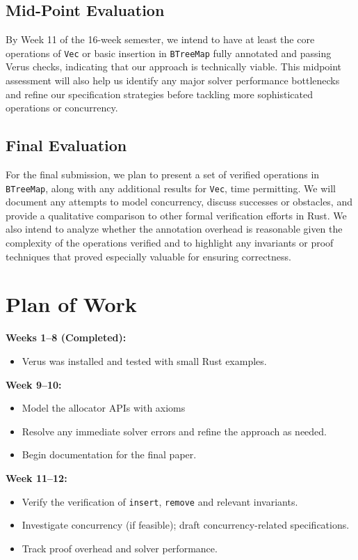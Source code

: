 \documentclass[conference]{IEEEtran}
\begin{document}
\subsection{Mid-Point Evaluation}
By Week 11 of the 16-week semester, we intend to have at least the core operations of \texttt{Vec} or basic insertion in \texttt{BTreeMap} fully annotated and passing Verus checks, indicating that our approach is technically viable. This midpoint assessment will also help us identify any major solver performance bottlenecks and refine our specification strategies before tackling more sophisticated operations or concurrency.

\subsection{Final Evaluation}
For the final submission, we plan to present a set of verified operations in \texttt{BTreeMap}, along with any additional results for \texttt{Vec}, time permitting. We will document any attempts to model concurrency, discuss successes or obstacles, and provide a qualitative comparison to other formal verification efforts in Rust. We also intend to analyze whether the annotation overhead is reasonable given the complexity of the operations verified and to highlight any invariants or proof techniques that proved especially valuable for ensuring correctness.


\section{Plan of Work}
\noindent\textbf{Weeks 1--8 (Completed):}
\begin{itemize}
\item Verus was installed and tested with small Rust examples.
\end{itemize}

\noindent\textbf{Week 9--10:}
\begin{itemize}
\item Model the allocator APIs with axioms
\item Resolve any immediate solver errors and refine the approach as needed.
\item Begin documentation for the final paper.
\end{itemize}

\noindent\textbf{Week 11--12:}
\begin{itemize}
\item Verify the verification of \texttt{insert}, \texttt{remove} and relevant invariants.
\item Investigate concurrency (if feasible); draft concurrency-related specifications.
\item Track proof overhead and solver performance.
\end{itemize}
\end{document}
